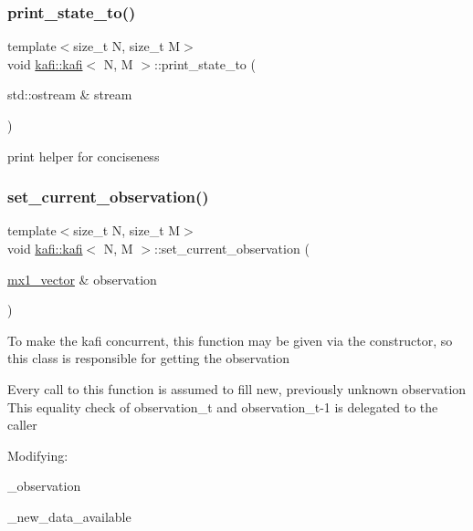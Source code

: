 \subsubsection{\texorpdfstring{print\+\_\+state\+\_\+to()}{print\_state\_to()}}
{\footnotesize\ttfamily template$<$size\+\_\+t N, size\+\_\+t M$>$ \\
void \hyperlink{classkafi_1_1kafi}{kafi\+::kafi}$<$ N, M $>$\+::print\+\_\+state\+\_\+to (\begin{DoxyParamCaption}\item[{std\+::ostream \&}]{stream }\end{DoxyParamCaption})\hspace{0.3cm}{\ttfamily [inline]}}

print helper for conciseness \mbox{\label{classkafi_1_1kafi_a8bb1520922ac9bab7479c89a9681b956}} 
\subsubsection{\texorpdfstring{set\+\_\+current\+\_\+observation()}{set\_current\_observation()}}
{\footnotesize\ttfamily template$<$size\+\_\+t N, size\+\_\+t M$>$ \\
void \hyperlink{classkafi_1_1kafi}{kafi\+::kafi}$<$ N, M $>$\+::set\+\_\+current\+\_\+observation (\begin{DoxyParamCaption}\item[{\hyperlink{classkafi_1_1kafi_a3a6f412f435a9e1f81178f36965822c3}{mx1\+\_\+vector} \&}]{observation }\end{DoxyParamCaption})\hspace{0.3cm}{\ttfamily [inline]}}

To make the kafi concurrent, this function may be given via the constructor, so this class is responsible for getting the observation

Every call to this function is assumed to fill new, previously unknown observation This equality check of observation\+\_\+t and observation\+\_\+t-\/1 is delegated to the caller

Modifying\+:
\begin{DoxyItemize}
\item {\ttfamily \+\_\+observation}
\item {\ttfamily \+\_\+new\+\_\+data\+\_\+available}
\end{DoxyItemize}


